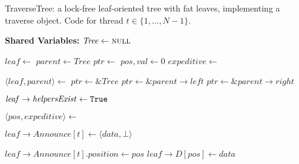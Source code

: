     \begin{algorithm}[t]
        \footnotesize
        \caption{TraverseTree: a lock-free leaf-oriented tree with fat leaves, implementing a traverse object.
         Code for thread $t \in \{ 1, \ldots, N-1\}$.}
        \label{alg:tree}
        \begin{algorithmic}[1]
    
            \Statex \textbf{Shared Variables:}
            \State $\mathit{Tree} \gets \mbox{\sc null}$ 
    
                \State $\mathit{leaf} \gets$ \NULL
                \State $\mathit{parent} \gets \mathit{Tree}$
                \State $\mathit{ptr} \gets$ \NULL
                \State $\mathit{pos}, \mathit{val} \gets 0$
                \State $\mathit{expeditive} \gets$ \False
    
                \While{\True} \label{alg:tree:while}
                    \State $\langle \mathit{leaf, parent} \rangle \gets$  \label{alg:tree:search}
                     \label{alg:tree:ptr-parent:null}
                        \State $\mathit{ptr} \gets \&\mathit{Tree}$
                        \State $\mathit{ptr} \gets \&\mathit{parent} \rightarrow \mathit{left}$ \label{alg:tree:ptr-left}
                    \Else
                        \State $\mathit{ptr} \gets \&\mathit{parent} \rightarrow \mathit{right}$ \label{alg:tree:ptr-right}
                    \EndIf
    
                        \State $\mathit{leaf} \rightarrow \mathit{helpersExist} \gets \mbox{\texttt{True}}$ \label{alg:tree:switch-mode:}
                    \EndIf
    
                    \State $\langle \mathit{pos, expeditive} \rangle \gets$  \label{alg:tree:get-pos}
    
                        \State $\mathit{leaf} \rightarrow \mathit{Announce}[t] \gets \langle \mathit{data, \bot} \rangle$ \label{alg:tree:announce:op}
                    \EndIf
    
                     \label{alg:tree:pos-in-D}
                            \State $\mathit{leaf} \rightarrow \mathit{Announce}[t].\mathit{position} \gets \mathit{pos}$ \label{alg:tree:announce:pos-in-D}
                        \EndIf
                        \State $\mathit{leaf} \rightarrow \mathit{D}[\mathit{pos}] \gets \mathit{data}$ \label{alg:tree:store-in-D}
                    \Else \label{alg:tree:pos-not-in-D}
                        \State {}
                    \EndIf
    

\end{algorithmic}
\end{algorithm}
